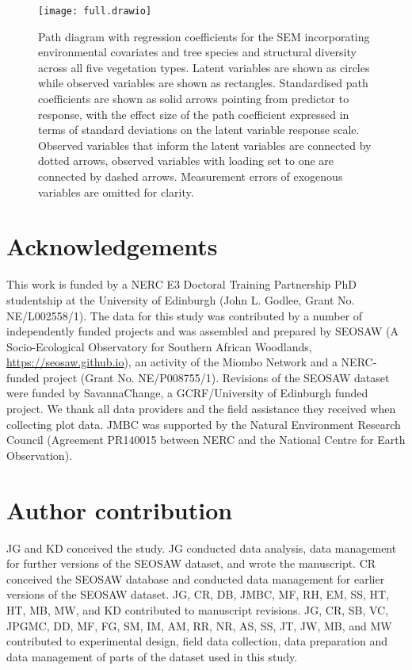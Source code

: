 \documentclass[12pt,a4paper]{article}
\begin{document}
\begin{figure}[H]
\centering
	\texttt{[image: full.drawio]}
	\caption{Path diagram with regression coefficients for the SEM incorporating environmental covariates and tree species and structural diversity across all five vegetation types. Latent variables are shown as circles while observed variables are shown as rectangles. Standardised path coefficients are shown as solid arrows pointing from predictor to response, with the effect size of the path coefficient expressed in terms of standard deviations on the latent variable response scale. Observed variables that inform the latent variables are connected by dotted arrows, observed variables with loading set to one are connected by dashed arrows. Measurement errors of exogenous variables are omitted for clarity.}
	\label{full_mod}
\end{figure}
\newpage{}

\section{Acknowledgements}

This work is funded by a NERC E3 Doctoral Training Partnership PhD studentship at the University of Edinburgh (John L. Godlee, Grant No. NE/L002558/1). The data for this study was contributed by a number of independently funded projects and was assembled and prepared by SEOSAW (A Socio-Ecological Observatory for Southern African Woodlands, \url{https://seosaw.github.io}), an activity of the Miombo Network and a NERC-funded project (Grant No. NE/P008755/1). Revisions of the SEOSAW dataset were funded by SavannaChange, a GCRF/University of Edinburgh funded project. We thank all data providers and the field assistance they received when collecting plot data. JMBC was supported by the Natural Environment Research Council (Agreement PR140015 between NERC and the National Centre for Earth Observation). 

\section{Author contribution}

JG and KD conceived the study. JG conducted data analysis, data management for further versions of the SEOSAW dataset, and wrote the manuscript. CR conceived the SEOSAW database and conducted data management for earlier versions of the SEOSAW dataset. JG, CR, DB, JMBC, MF, RH, EM, SS, HT, HT, MB, MW, and KD contributed to manuscript revisions. JG, CR, SB, VC, JPGMC, DD, MF, FG, SM, IM, AM, RR, NR, AS, SS, JT, JW, MB, and MW contributed to experimental design, field data collection, data preparation and data management of parts of the dataset used in this study. 
\end{document}
